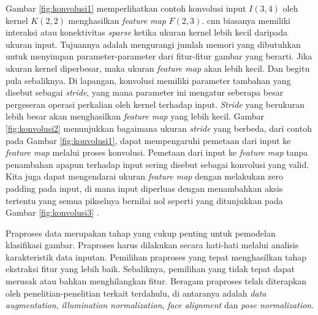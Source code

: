 Gambar \ref{fig:konvolusi1} memperlihatkan contoh konvolusi input $I(3,4)$ oleh kernel $K(2,2)$ menghasilkan \textit{feature map} $F(2,3)$. \acrshort{cnn} biasanya memiliki interaksi atau konektivitas \textit{sparse} ketika ukuran kernel lebih kecil daripada ukuran input. Tujuannya adalah mengurangi jumlah memori yang dibutuhkan untuk menyimpan parameter-parameter dari fitur-fitur gambar yang berarti. Jika ukuran kernel diperbesar, maka ukuran \textit{feature map} akan lebih kecil. Dan begitu pula sebaliknya. Di lapangan, konvolusi memiliki parameter tambahan yang disebut sebagai \textit{stride}, yang mana parameter ini mengatur seberapa besar pergeseran operasi perkalian oleh kernel terhadap input. \textit{Stride} yang berukuran lebih besar akan menghasilkan \textit{feature map} yang lebih kecil. Gambar \ref{fig:konvolusi2} menunjukkan bagaimana ukuran \textit{stride} yang berbeda, dari contoh pada Gambar \ref{fig:konvolusi1}, dapat mempengaruhi pemetaan dari input ke \textit{feature map} melalui proses konvolusi. Pemetaan dari input ke \textit{feature map} tanpa penambahan apapun terhadap input sering disebut sebagai konvolusi yang valid. Kita juga dapat mengendarai ukuran \textit{feature map} dengan melakukan zero padding pada input, di mana input diperluas dengan menambahkan aksis tertentu yang semua pikselnya bernilai nol seperti yang ditunjukkan pada Gambar \ref{fig:konvolusi3} .

Praproses data merupakan tahap yang cukup penting untuk pemodelan klasifikasi gambar. Praproses harus dilakukan secara hati-hati melalui analisis karakteristik data inputan. Pemilihan praproses yang tepat menghasilkan tahap ekstraksi fitur yang lebih baik. Sebaliknya, pemilihan yang tidak tepat dapat merusak atau bahkan menghilangkan fitur. Beragam praproses telah diterapkan oleh penelitian-penelitian terkait terdahulu, di antaranya adalah \textit{data augmentation}, \textit{illumination normalization}, \textit{face alignment} dan \textit{pose normalization}.


